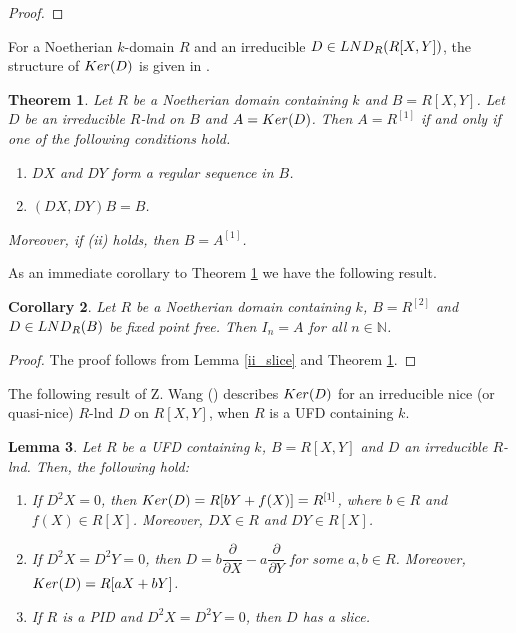 \documentclass[a4paper,12pt]{article}
\newtheorem{thm}{Theorem}[section]
\newtheorem{lem}[thm]{Lemma}
\newtheorem{cor}[thm]{Corollary}
\newcommand{\bN}{\mathbb N}
\begin{document}
{\begin{proof}
%
\end{proof}


\indent
For a Noetherian $k$-domain $R$ and an irreducible $D \in{\rm LND}_R(R[X,Y])$, the structure of ${\rm Ker}(D)$   is given in \cite[Theorem 4.7]{BD97}.

\begin{thm}\label{BhD}
Let $R$ be a Noetherian domain containing $k$ and $B=R[X,Y]$. Let $D$ be an irreducible $R$-lnd on $B$ and $A={\rm Ker}(D)$. Then $A=R^{[1]}$ if and only if one of the following conditions hold.
\begin{enumerate}
	\item [\rm(i)] $DX$ and $DY$ form a regular sequence in $B$.
	\item [\rm(ii)] $(DX,DY)B=B$.
\end{enumerate}
Moreover, if {\rm(ii)} holds, then $B=A^{[1]}$.
\end{thm}

\noindent
As an immediate corollary to Theorem \ref{BhD} we have the following result.
\begin{cor}\label{2varufd}
Let $R$ be a Noetherian domain containing $k$, $B=R^{[2]}$ and $D \in {\rm LND}_{R}(B)$ be fixed point free. Then $I_n=A$ for all $n \in \bN$.
\end{cor}

\begin{proof} The proof follows from Lemma \ref{ii_slice} and Theorem \ref{BhD}.
\end{proof}

\smallskip
\indent 
The following result of Z. Wang (\cite[Lemma 4.1 and Lemma 4.2]{W}) describes ${\rm Ker}(D)$ for an irreducible nice (or quasi-nice) $R$-lnd $D$ on $R[X,Y]$, when $R$ is a UFD containing $k$.  
\begin{lem}\label{Wang}
Let $R$ be a {\rm UFD} containing $k$, $B=R[X,Y]$ and $D$ an irreducible $R$-lnd. Then, the following hold:
\begin{enumerate}
	\item [\rm (i)] If $D^{2}X=0$, then ${\rm Ker}(D)=R[bY+f(X)]=R^{[1]}$, where $b \in R$ and $f(X) \in R[X]$. Moreover, $DX \in R$ and $DY \in R[X]$.
	\item [\rm (ii)] If $D^{2}X=D^{2}Y=0$, then $D=b\dfrac{\partial }{\partial X}-a\dfrac{\partial }{\partial Y}$ for some $a,b \in R$. Moreover, ${\rm Ker}(D)=R[aX+bY]$.
	\item [\rm (iii)] If $R$ is a {\rm PID} and $D^{2}X=D^{2}Y=0$, then $D$ has a slice.
\end{enumerate}
\end{lem}

}
\end{document}
